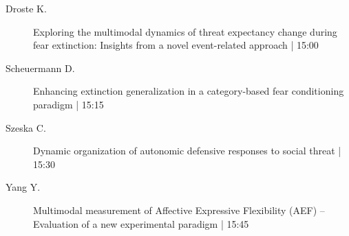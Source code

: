 \begin{symposium}
\begin{description}
                \item [ Droste K.] Exploring the multimodal dynamics of threat expectancy change during fear extinction: Insights from a novel event-related approach \textcolor{mygray}{ | 15:00}    
                
                \item [ Scheuermann D.] Enhancing extinction generalization in a category-based fear conditioning paradigm \textcolor{mygray}{ | 15:15}    
                
                \item [ Szeska C.] Dynamic organization of autonomic defensive responses to social threat \textcolor{mygray}{ | 15:30}    
                
                \item [ Yang Y.] Multimodal measurement of Affective Expressive Flexibility (AEF) – Evaluation of a new experimental paradigm \textcolor{mygray}{ | 15:45}    
                
            \end{description} 
            \end{symposium}
            